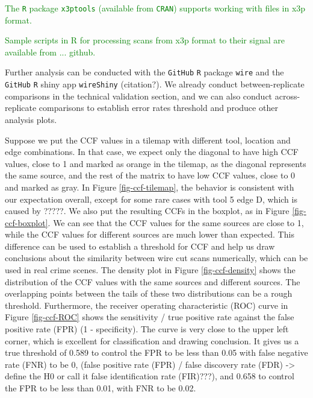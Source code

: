 \documentclass[fleqn,10pt]{wlscirep}
\newcommand{\tom}[1]{{\textcolor{RedOrange}{#1}}}
\newcommand{\hh}[1]{{\textcolor{Green}{#1}}}
\begin{document}
\hh{The \texttt{R} package \texttt{x3ptools} (available from \texttt{CRAN}) supports working with files in  x3p format. }

\hh{Sample scripts in R for processing scans from x3p format to their signal are available from ... github. }

Further analysis can be conducted with the \texttt{GitHub} \texttt{R}
package \texttt{wire} and the \texttt{GitHub} \texttt{R} shiny app
\texttt{wireShiny} \tom{(citation?)}. We already conduct
between-replicate comparisons in the technical validation section, and
we can also conduct across-replicate comparisons to establish error
rates threshold and produce other analysis plots.

Suppose we put the CCF values in a tilemap with different tool, location
and edge combinations. In that case, we expect only the diagonal to have
high CCF values, close to 1 and marked as orange in the tilemap, as the
diagonal represents the same source, and the rest of the matrix to have
low CCF values, close to 0 and marked as gray. In Figure
\ref{fig-ccf-tilemap}, the behavior is consistent with our expectation
overall, except for some rare cases with tool 5 edge D, which is caused
by \tom{?????}. We also put the resulting CCFs in the boxplot, as in
Figure \ref{fig-ccf-boxplot}. We can see that the CCF values for the
same sources are close to 1, while the CCF values for different sources
are much lower than expected. This difference can be used to establish a
threshold for CCF and help us draw conclusions about the similarity
between wire cut scans numerically, which can be used in real crime
scenes. The density plot in Figure \ref{fig-ccf-density} shows the
distribution of the CCF values with the same sources and different
sources. The overlapping points between the tails of these two
distributions can be a rough threshold. Furthermore, the receiver
operating characteristic (ROC) curve in Figure \ref{fig-ccf-ROC} shows
the sensitivity / true positive rate against the false positive rate
(FPR) (1 - specificity). The curve is very close to the upper left
corner, which is excellent for classification and drawing conclusion. It
gives us a true threshold of 0.589 to control the FPR to be less than
0.05 with false negative rate (FNR) to be 0,
\tom{(false positive rate (FPR) / false discovery rate (FDR) -> define the H0 or call it false identification rate (FIR)???)},
and 0.658 to control the FPR to be less than 0.01, with FNR to be 0.02.
\end{document}

